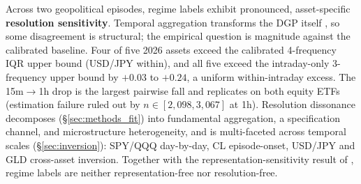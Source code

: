 \documentclass[preprint,12pt,authoryear]{elsarticle}
\begin{document}
Across two geopolitical episodes, regime labels exhibit pronounced, asset-specific \textbf{resolution sensitivity}. Temporal aggregation transforms the DGP itself \citep{ChanZhangCheung2009}, so some disagreement is structural; the empirical question is magnitude against the calibrated baseline. Four of five 2026 assets exceed the calibrated 4-frequency IQR upper bound (USD/JPY within), and all five exceed the intraday-only 3-frequency upper bound by $+0.03$ to $+0.24$, a uniform within-intraday excess. The 15m$\to$1h drop is the largest pairwise fall and replicates on both equity ETFs (estimation failure ruled out by $n\in[2{,}098, 3{,}067]$ at 1h). Resolution dissonance decomposes (\S\ref{sec:methods_fit}) into fundamental aggregation, a specification channel, and microstructure heterogeneity, and is multi-faceted across temporal scales (\S\ref{sec:inversion}): SPY/QQQ day-by-day, CL episode-onset, USD/JPY and GLD cross-asset inversion. Together with the representation-sensitivity result of \citet{companion_rep}, regime labels are neither representation-free nor resolution-free.
\end{document}
